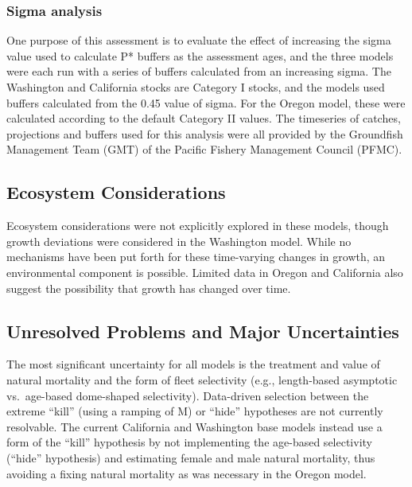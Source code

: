 \documentclass[12pt,]{article}
\begin{document}
\subsubsection*{Sigma analysis}\label{sigma-analysis}

One purpose of this assessment is to evaluate the effect of increasing
the sigma value used to calculate P* buffers as the assessment ages, and
the three models were each run with a series of buffers calculated from
an increasing sigma. The Washington and California stocks are Category I
stocks, and the models used buffers calculated from the 0.45 value of
sigma. For the Oregon model, these were calculated according to the
default Category II values. The timeseries of catches, projections and
buffers used for this analysis were all provided by the Groundfish
Management Team (GMT) of the Pacific Fishery Management Council (PFMC).

\subsection*{Ecosystem Considerations}\label{ecosystem-considerations}

Ecosystem considerations were not explicitly explored in these models,
though growth deviations were considered in the Washington model. While
no mechanisms have been put forth for these time-varying changes in
growth, an environmental component is possible. Limited data in Oregon
and California also suggest the possibility that growth has changed over
time.

\subsection*{Unresolved Problems and Major
Uncertainties}\label{unresolved-problems-and-major-uncertainties}

The most significant uncertainty for all models is the treatment and
value of natural mortality and the form of fleet selectivity (e.g.,
length-based asymptotic vs.~age-based dome-shaped selectivity).
Data-driven selection between the extreme ``kill'' (using a ramping of
M) or ``hide'' hypotheses are not currently resolvable. The current
California and Washington base models instead use a form of the ``kill''
hypothesis by not implementing the age-based selectivity (``hide''
hypothesis) and estimating female and male natural mortality, thus
avoiding a fixing natural mortality as was necessary in the Oregon
model.
\end{document}
